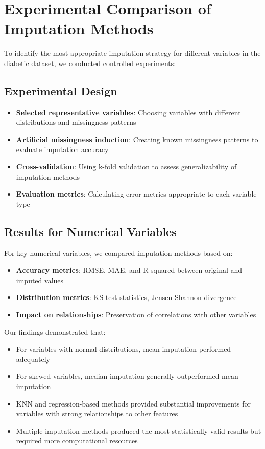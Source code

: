\section{Experimental Comparison of Imputation Methods}
\label{sec:imputation_comparison}

To identify the most appropriate imputation strategy for different variables in the diabetic dataset, we conducted controlled experiments:

\subsection{Experimental Design}
\begin{itemize}
    \item \textbf{Selected representative variables}: Choosing variables with different distributions and missingness patterns
    \item \textbf{Artificial missingness induction}: Creating known missingness patterns to evaluate imputation accuracy
    \item \textbf{Cross-validation}: Using k-fold validation to assess generalizability of imputation methods
    \item \textbf{Evaluation metrics}: Calculating error metrics appropriate to each variable type
\end{itemize}

\subsection{Results for Numerical Variables}
For key numerical variables, we compared imputation methods based on:
\begin{itemize}
    \item \textbf{Accuracy metrics}: RMSE, MAE, and R-squared between original and imputed values
    \item \textbf{Distribution metrics}: KS-test statistics, Jensen-Shannon divergence
    \item \textbf{Impact on relationships}: Preservation of correlations with other variables
\end{itemize}

Our findings demonstrated that:
\begin{itemize}
    \item For variables with normal distributions, mean imputation performed adequately
    \item For skewed variables, median imputation generally outperformed mean imputation
    \item KNN and regression-based methods provided substantial improvements for variables with strong relationships to other features
    \item Multiple imputation methods produced the most statistically valid results but required more computational resources
\end{itemize}

